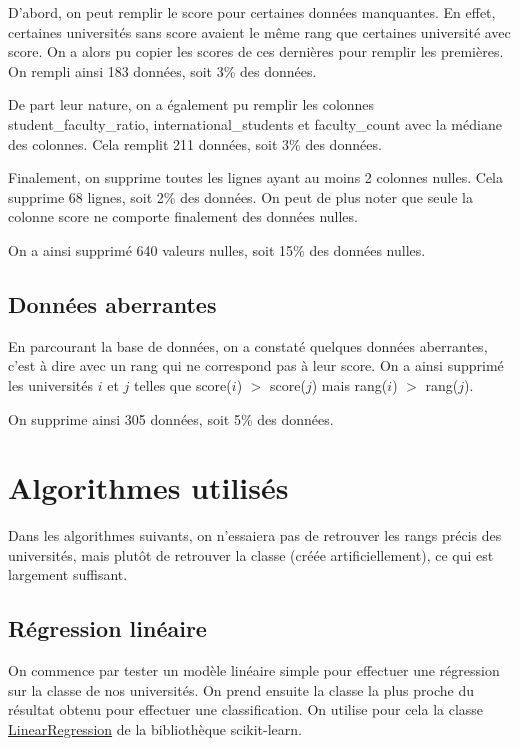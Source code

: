 \documentclass[twocolumns]{udes_rapport}
\begin{document}
        D'abord, on peut remplir le score pour certaines données manquantes. En effet, certaines universités sans score avaient le même rang que certaines université avec score. On a alors pu copier les scores de ces dernières pour remplir les premières. On rempli ainsi 183 données, soit 3\% des données.
        
        De part leur nature, on a également pu remplir les colonnes \textsf{student\_faculty\_ratio}, \textsf{international\_students} et \textsf{faculty\_count} avec la médiane des colonnes. Cela remplit 211 données, soit 3\% des données.
        
        Finalement, on supprime toutes les lignes ayant au moins 2 colonnes nulles. Cela supprime 68 lignes, soit 2\% des données. On peut de plus noter que seule la colonne \textsf{score} ne comporte finalement des données nulles.
        
        On a ainsi supprimé 640 valeurs nulles, soit 15\% des données nulles.

    \subsection{Données aberrantes}\label{subsec:outliers}
    
        En parcourant la base de données, on a constaté quelques données aberrantes, c'est à dire avec un rang qui ne correspond pas à leur score. On a ainsi supprimé les universités $i$ et $j$ telles que score($i$) $>$ score($j$) mais rang($i$) $>$ rang($j$).

        On supprime ainsi 305 données, soit 5\% des données.
    
\section{Algorithmes utilisés}\label{sec:algorithms}

    Dans les algorithmes suivants, on n'essaiera pas de retrouver les rangs précis des universités, mais plutôt de retrouver la classe (créée artificiellement), ce qui est largement suffisant.

    \subsection{Régression linéaire}\label{subsec:lm}
    
        On commence par tester un modèle linéaire simple pour effectuer une régression sur la classe de nos universités. On prend ensuite la classe la plus proche du résultat obtenu pour effectuer une classification. On utilise pour cela la classe \href{https://scikit-learn.org/stable/modules/generated/sklearn.linear_model.LinearRegression.html}{\textsf{LinearRegression}} de la bibliothèque \textsf{scikit-learn}. 
\end{document}
